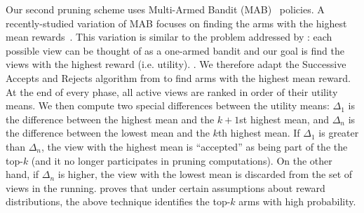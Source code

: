 \label{sec:multi_armed_bandit}
Our second pruning scheme uses Multi-Armed Bandit (MAB)~\cite{bandits, AuerCF02, LaiR85} policies.
A recently-studied variation of MAB focuses on finding the arms with the highest
mean rewards~\cite{BubeckWV13, audibert2010best}.
This variation is similar to the problem addressed by \SeeDB: each possible view 
can be thought of as a one-armed bandit and our goal is find the views with the 
highest reward (i.e. utility). .
We therefore adapt the Successive Accepts and Rejects algorithm from \cite{BubeckWV13} 
to find arms with the highest mean reward. 
At the end of every phase, all active views are ranked in order of their utility means. 
We then compute two special differences between the utility means: $\Delta_1$
is the difference between the highest mean and the $k+1$st highest mean, and
$\Delta_n$ is the difference between the lowest mean and the $k$th highest mean.
If $\Delta_1$ is greater than $\Delta_n$, the view with the highest mean is
``accepted'' as being part of the the top-$k$ (and it no longer participates
in pruning computations).
On the other hand, if $\Delta_n$ is higher, the view with the lowest mean is discarded
from the set of views in the running.
\cite{BubeckWV13} proves that under certain assumptions about reward distributions,
the above technique identifies the top-$k$ arms with high probability.



